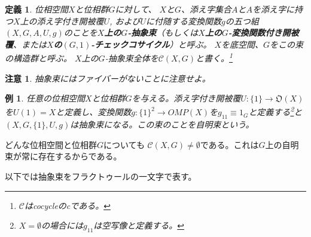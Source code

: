 \documentclass[leqno]{jsarticle}
\newtheorem{df}[thm]{定義}
\newtheorem{exam}[thm]{例}
\newtheorem*{cau}{注意}
\begin{document}
\begin{df}
位相空間$X$と位相群$G$に対して、
$X$と$G$、添え字集合$A$と$A$を添え字に持つ$X$上の添え字付き開被覆$U$, および$U$に付随する変換関数$g$の五つ組$(X, G, A, U, g)$のことを\textbf{$X$上の$G$-抽象束}（もしくは\textbf{$X$上の$G$-変換関数付き開被覆}、または\textbf{$X$の$(G, 1)$-チェックコサイクル}）と呼ぶ。
$X$を底空間、$G$をこの束の構造群と呼ぶ。
$X$上の$G$-抽象束全体を$\mathscr{C}(X,G)$と書く。\footnote{$\mathscr{C}$はcocycleのcである。}
\end{df}
\begin{cau}
抽象束にはファイバーがないことに注意せよ。
\end{cau}
\begin{exam}
任意の位相空間$X$と位相群$G$を与える。添え字付き開被覆$U:\{1\}\to \mathfrak{O}(X)$を$U(1)=X$と定義し、変換関数$g:\{1\}^2\to OMP(X)$を$g_{11}\equiv1_G$と定義する\footnote{$X=\emptyset$の場合には$g_{11}$は空写像と定義する。}と$(X, G, \{1\}, U, g)$は抽象束になる。この束のことを自明束という。
\end{exam}
どんな位相空間と位相群$G$についても
$\mathscr{C}(X,G)\neq \emptyset$である。これは$G$上の自明束が常に存在するからである。

以下では抽象束をフラクトゥールの一文字で表す。
\end{document}
